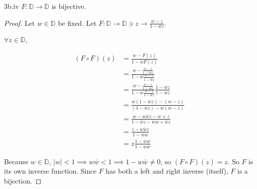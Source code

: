 \documentclass{article}
\begin{document}
\begin{claim}{3b.iv}\label{Claim 3biv.}
    $F: \mathbb{D} \to \mathbb{D}$ is bijective.
\end{claim}
\begin{proof}
    Let $w \in \mathbb{D}$ be fixed. Let $F: \mathbb{D} \to \mathbb{D} \ni z \to \frac{w - z}{1 - \bar{w}z}$.

    $\forall z \in \mathbb{D}$,
    
    \begin{align*}
        (F \circ F)(z) &= \frac{w - F(z)}{1 - \bar{w}F(z)} \\
        &= \frac{w - \frac{w - z}{1 - \bar{w}z}}{1 - \bar{w}\frac{w - z}{1 - \bar{w}z}} \\
        &= \frac{w - \frac{w - z}{1 - \bar{w}z}}{1 - \bar{w}\frac{w - z}{1 - \bar{w}z}} \frac{1 - \bar{w}z}{1 - \bar{w}z} \\
        &= \frac{w(1 - \bar{w}z) - (w - z)}{(1 - \bar{w}z) - \bar{w}(w - z)} \\
        &= \frac{w - w\bar{w}z - w + z}{1 - \bar{w}z - \bar{w}w + \bar{w}z} \\
        &= \frac{z - w\bar{w}z}{1 - \bar{w}w} \\
        &= z\frac{1 - w\bar{w}}{1 - w\bar{w}}
    \end{align*}

    Because $w \in \mathbb{D}$, $|w| < 1 \implies w\bar{w} < 1 \implies 1 - w\bar{w} \neq 0$, so $(F \circ F)(z) = z$. So $F$ is its own inverse function. Since $F$ has both a left and right inverse (itself), $F$ is a bijection.      
\end{proof}

\bigskip
\end{document}

